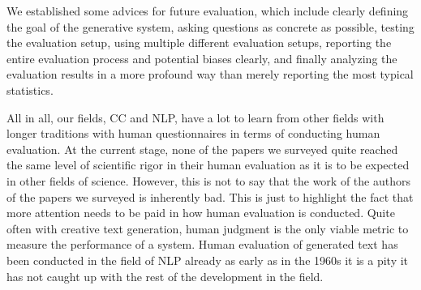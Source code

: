 \documentclass[11pt,a4paper]{article}
\begin{document}
We established some advices for future evaluation, which include clearly defining the goal of the generative system, asking questions as concrete as possible, testing the evaluation setup, using multiple different evaluation setups, reporting the entire evaluation process and potential biases clearly, and finally analyzing the evaluation results in a more profound way than merely reporting the most typical statistics.

All in all, our fields, CC and NLP, have a lot to learn from other fields with longer traditions with human questionnaires in terms of conducting human evaluation. At the current stage, none of the papers we surveyed quite reached the same level of scientific rigor in their human evaluation as it is to be expected in other fields of science. However, this is not to say that the work of the authors of the papers we surveyed is inherently bad. This is just to highlight the fact that more attention needs to be paid in how human evaluation is conducted. Quite often with creative text generation, human judgment is the only viable metric to measure the performance of a system. Human evaluation of generated text has been conducted in the field of NLP already as early as in the 1960s \cite{mcdaniel-etal-1967-evaluation} it is a pity it has not caught up with the rest of the development in the field.




\end{document}
